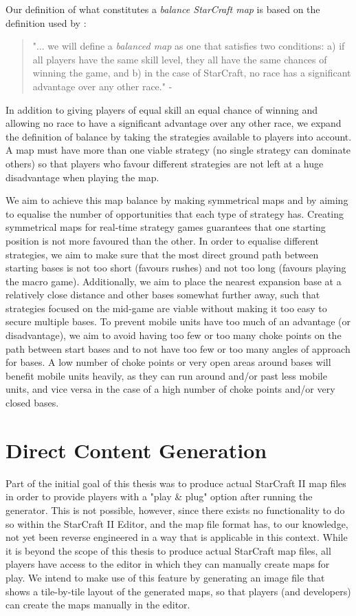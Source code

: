 Our definition of what constitutes a \textit{balance StarCraft map} is based on the definition used by \citeauthor{uriarte2013psmage}\cite{uriarte2013psmage}:
\begin{quote}
	"... we will define a \textit{balanced map} as one that satisfies two conditions: a) if all players have the same skill level, they all have the same chances of winning the game, and b) in the case of StarCraft, no race has a significant advantage over any other race." - \citeauthor{uriarte2013psmage}\cite{uriarte2013psmage}
\end{quote}

In addition to giving players of equal skill an equal chance of winning and allowing no race to have a significant advantage over any other race, we expand the definition of balance by taking the strategies available to players into account. A map must have more than one viable strategy (no single strategy can dominate others) so that players who favour different strategies are not left at a huge disadvantage when playing the map. 

We aim to achieve this map balance by making symmetrical maps and by aiming to equalise the number of opportunities that each type of strategy has. Creating symmetrical maps for real-time strategy games guarantees that one starting position is not more favoured than the other. In order to equalise different strategies, we aim to make sure that the most direct ground path between starting bases is not too short (favours rushes) and not too long (favours playing the macro game). Additionally, we aim to place the nearest expansion base at a relatively close distance and other bases somewhat further away, such that strategies focused on the mid-game are viable without making it too easy to secure multiple bases. To prevent mobile units have too much of an advantage (or disadvantage), we aim to avoid having too few or too many choke points on the path between start bases and to not have too few or too many angles of approach for bases. A low number of choke points or very open areas around bases will benefit mobile units heavily, as they can run around and/or past less mobile units, and vice versa in the case of a high number of choke points and/or very closed bases.

\section{Direct Content Generation}
\label{goals_representation}
Part of the initial goal of this thesis was to produce actual StarCraft II map files in order to provide players with a "play \& plug" option after running the generator. This is not possible, however, since there exists no functionality to do so within the StarCraft II Editor, and the map file format has, to our knowledge, not yet been reverse engineered in a way that is applicable in this context. While it is beyond the scope of this thesis to produce actual StarCraft map files, all players have access to the editor in which they can manually create maps for play. We intend to make use of this feature by generating an image file that shows a tile-by-tile layout of the generated maps, so that players (and developers) can create the maps manually in the editor.

